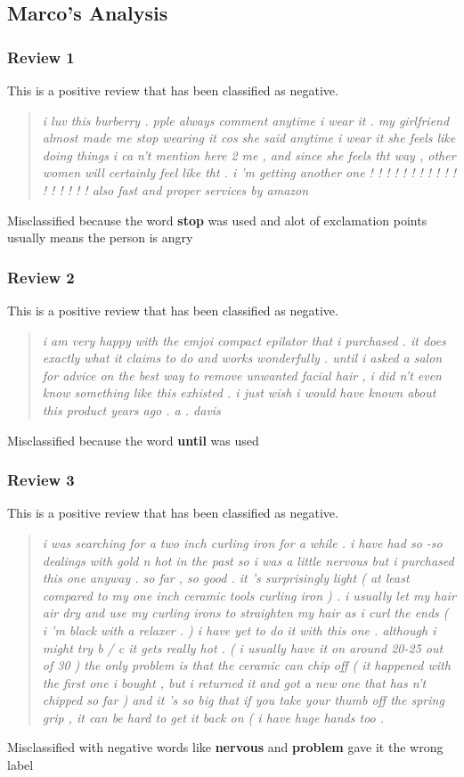\documentclass[runningheads]{llncs}
\begin{document}
    \subsection{Marco's Analysis}
    \subsubsection{Review 1}
    This is a positive review that has been classified as negative.
    \begin{quotation}
        \textit{i luv this burberry . pple always comment anytime i wear it . my girlfriend almost made me stop wearing it cos she said anytime i wear it she feels like doing things i ca n't mention here 2 me , and since she feels tht way , other women will certainly feel like tht . i 'm getting another one ! ! ! ! ! ! ! ! ! ! ! ! ! ! ! ! ! also fast and proper services by amazon}
    \end{quotation}
    Misclassified because the word \textbf{stop} was used and alot of exclamation points usually means the person is angry

    \subsubsection{Review 2}
    This is a positive review that has been classified as negative.
    \begin{quotation}
        \textit{i am very happy with the emjoi compact epilator that i purchased . it does exactly what it claims to do and works wonderfully . until i asked a salon for advice on the best way to remove unwanted facial hair , i did n't even know something like this exhisted . i just wish i would have known about this product years ago . a . davis}
    \end{quotation}
    Misclassified because the word \textbf{until} was used

    \subsubsection{Review 3}
    This is a positive review that has been classified as negative.
    \begin{quotation}
        \textit{i was searching for a two inch curling iron for a while . i have had so -so dealings with gold n hot in the past so i was a little nervous but i purchased this one anyway . so far , so good . it 's surprisingly light ( at least compared to my one inch ceramic tools curling iron ) . i usually let my hair air dry and use my curling irons to straighten my hair as i curl the ends ( i 'm black with a relaxer . ) i have yet to do it with this one . although i might try b / c it gets really hot . ( i usually have it on around 20-25 out of 30 ) the only problem is that the ceramic can chip off ( it happened with the first one i bought , but i returned it and got a new one that has n't chipped so far ) and it 's so big that if you take your thumb off the spring grip , it can be hard to get it back on ( i have huge hands too .}
    \end{quotation}
    Misclassified with negative words like \textbf{nervous} and \textbf{problem} gave it the wrong label
\end{document}
